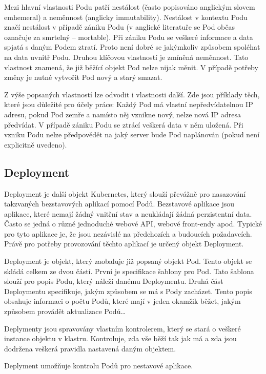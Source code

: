 Mezi hlavní vlastnosti Podu patří nestálost (často popisováno anglickým slovem emhemeral) a neměnnost (anglicky immutability). Nestálost v kontextu Podu značí nestálost v případě zániku Podu (v anglické literatuře se Pod občas označuje za smrtelný -- mortable). Při zániku Podu se veškeré informace a data spjatá s daným Podem ztratí. Proto není dobré se jakýmkoliv způsobem spoléhat na data uvnitř Podu. Druhou klíčovou vlastností je zmíněná neměnnost. Tato vlastnost znamená, že již běžící objekt Pod nelze nijak měnit. V případě potřeby změny je nutné vytvořit Pod nový a starý smazat. \cite{poulton_2022_the}

Z výše popsaných vlastností lze odvodit i vlastnosti další. Zde jsou příklady těch, které jsou důležité pro účely práce: Každý Pod má vlastní nepředvídatelnou IP adresu, pokud Pod zemře a namísto něj vznikne nový, nelze nová IP adresa předvídat. V případě zániku Podu se ztrácí veškerá data v něm uložená. Při vzniku Podu nelze předpovědět na jaký server bude Pod naplánován (pokud není explicitně uvedeno). 

\subsection{Deployment}
Deployment je další objekt Kubernetes, který slouží převážně pro nasazování takzvaných bezstavových aplikací pomocí Podů. Bezstavové aplikace jsou aplikace, které nemají žádný vnitřní stav a neukládají žádná perzistentní data. Často se jedná o různé jednoduché webové API, webové front-endy apod. Typické pro tyto aplikace je, že jsou nezávislé na předchozích a budoucích požadavcích. Právě pro potřeby provozování těchto aplikací je určený objekt Deployment.

Deployment je objekt, který zaobaluje již popsaný objekt Pod. Tento objekt se skládá celkem ze dvou částí. První je specifikace šablony pro Pod. Tato šablona slouží pro popis Podu, který náleží danému Deploymentu. Druhá část Deploymentu specifikuje, jakým způsobem se má s Pody zacházet. Tento popis obsahuje informaci o počtu Podů, které mají v jeden okamžik běžet, jakým způsobem provádět aktualizace Podů\ldots

Deplymenty jsou spravovány vlastním kontrolerem, který se stará o veškeré instance objektu v klastru. Kontroluje, zda vše běží tak jak má a zda jsou dodržena veškerá pravidla nastavená daným objektem. \cite{poulton_2022_the}

Deplyment umožňuje kontrolu Podů pro nestavové aplikace.
